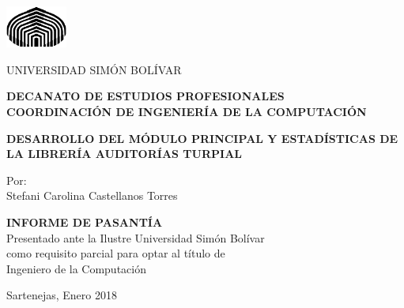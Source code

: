 \thispagestyle{empty}
\begin{center}
\begin{singlespace}
\includegraphics[width=2cm]{logo_USB}

{\large
  UNIVERSIDAD SIMÓN BOLÍVAR\\
}

\textbf{
  DECANATO DE ESTUDIOS PROFESIONALES\\
  COORDINACIÓN DE INGENIERÍA DE LA COMPUTACIÓN
}

\vspace{5cm}%
\textbf{
  DESARROLLO DEL MÓDULO PRINCIPAL Y ESTADÍSTICAS DE LA LIBRERÍA AUDITORÍAS TURPIAL
}
\vspace{5cm}



Por:\\
Stefani Carolina Castellanos Torres

\vspace{3cm}
  \textbf{INFORME DE PASANTÍA}\\
  Presentado ante la Ilustre Universidad Simón Bolívar\\
  como requisito parcial para optar al título de\\
  Ingeniero de la Computación\\
\selectfont

\vspace{3cm}
Sartenejas, Enero 2018

\end{singlespace}
\end{center}

